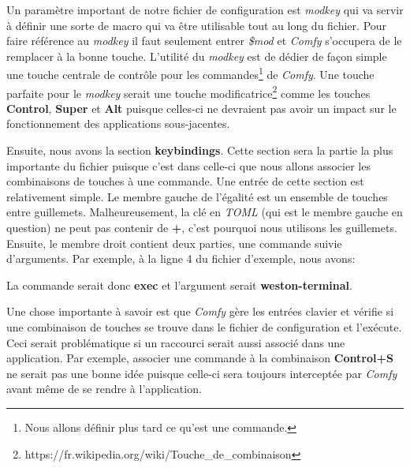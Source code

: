 \documentclass[titlepage]{article}
\begin{document}
\par
Un paramètre important de notre fichier de configuration est \textit{modkey}
qui va servir à définir une sorte de macro qui va être utilisable tout au long
du fichier. Pour faire référence au \textit{modkey} il faut seulement entrer
\textit{\$mod} et \textit{Comfy} s'occupera de le remplacer à la bonne touche.
L'utilité du \textit{modkey} est de dédier de façon simple une touche centrale
de contrôle pour les commandes\footnote{Nous allons définir plus tard ce qu'est
une commande.} de \textit{Comfy}. Une touche parfaite pour le \textit{modkey}
serait une touche
modificatrice\footnote{https://fr.wikipedia.org/wiki/Touche\_de\_combinaison}
comme les touches \textbf{Control}, \textbf{Super} et \textbf{Alt} puisque
celles-ci ne devraient pas avoir un impact sur le fonctionnement des
applications sous-jacentes.
\par
\bigskip
Ensuite, nous avons la section \textbf{keybindings}. Cette section sera la
partie la plus importante du fichier puisque c'est dans celle-ci que nous
allons associer les combinaisons de touches à une commande. Une entrée de cette
section est relativement simple. Le membre gauche de l'égalité est un ensemble
de touches entre guillemets. Malheureusement, la clé en \textit{TOML} (qui est
le membre gauche en question) ne peut pas contenir de \textbf{+}, c'est
pourquoi nous utilisons les guillemets. Ensuite, le membre droit contient deux
parties, une commande suivie d'arguments. Par exemple, à la ligne 4 du fichier
d'exemple, nous avons:



La commande serait donc \textbf{exec} et l'argument serait
\textbf{weston-terminal}.

\par
\bigskip
Une chose importante à savoir est que \textit{Comfy} gère les entrées clavier
et vérifie si une combinaison de touches se trouve dans le fichier de
configuration et l'exécute. Ceci serait problématique si un raccourci serait
aussi associé dans une application. Par exemple, associer une commande à la
combinaison \textbf{Control+S} ne serait pas une bonne idée puisque celle-ci
sera toujours interceptée par \textit{Comfy} avant même de se rendre à
l'application.
\end{document}
